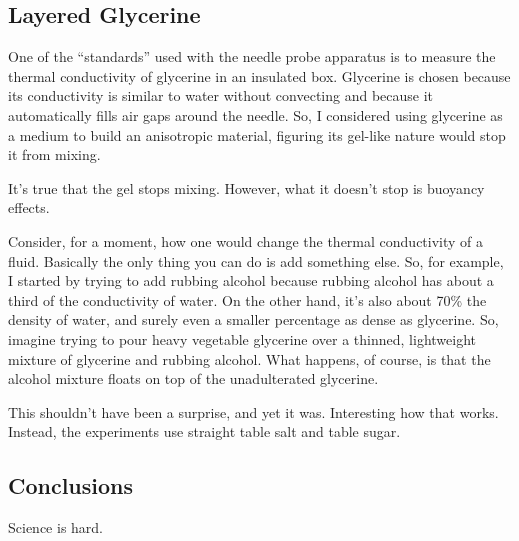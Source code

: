 \subsection{Layered Glycerine}

One of the ``standards'' used with the needle probe apparatus is to
measure the thermal conductivity of glycerine in an insulated box.
Glycerine is chosen because its conductivity is similar to water without
convecting and because it automatically fills air gaps around the
needle. So, I considered using glycerine as a medium to build an
anisotropic material, figuring its gel-like nature would stop it from
mixing.

It's true that the gel stops mixing. However, what it doesn't stop is
buoyancy effects.

Consider, for a moment, how one would change the thermal conductivity of
a fluid. Basically the only thing you can do is add something else. So,
for example, I started by trying to add rubbing alcohol because rubbing
alcohol has about a third of the conductivity of water. On the other
hand, it's also about 70\% the density of water, and surely even a
smaller percentage as dense as glycerine. So, imagine trying to pour
heavy vegetable glycerine over a thinned, lightweight mixture of
glycerine and rubbing alcohol. What happens, of course, is that the
alcohol mixture floats on top of the unadulterated glycerine.

This shouldn't have been a surprise, and yet it was. Interesting how
that works. Instead, the experiments use straight table salt and table
sugar.

\subsection{Conclusions}

Science is hard.
